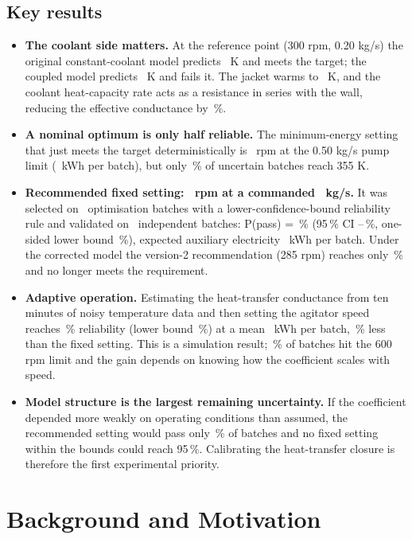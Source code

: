 \documentclass[11pt,letterpaper]{article}
\begin{document}
\subsection{Key results}
\begin{itemize}[leftmargin=*]
\item \textbf{The coolant side matters.} At the reference point (300 rpm, 0.20 kg/s) the original constant-coolant model predicts \vTOrig\ K and meets the target; the coupled model predicts \vTBase\ K and fails it. The jacket warms to \vPeakTJBase\ K, and the coolant heat-capacity rate acts as a resistance in series with the wall, reducing the effective conductance by \vUAEffDrop\,\%.
\item \textbf{A nominal optimum is only half reliable.} The minimum-energy setting that just meets the target deterministically is \vNomRpm\ rpm at the 0.50 kg/s pump limit (\vNomE\ kWh per batch), but only \vNomPass\,\% of uncertain batches reach 355 K.
\item \textbf{Recommended fixed setting: \vRecRpm\ rpm at a commanded \vRecM\ kg/s.} It was selected on \vNOpt\ optimisation batches with a lower-confidence-bound reliability rule and validated on \vNVal\ independent batches: P(pass) = \vRecPass\,\% (95\,\% CI \vRecLo--\vRecHi\,\%, one-sided lower bound \vRecLB\,\%), expected auxiliary electricity \vRecE\ kWh per batch. Under the corrected model the version-2 recommendation (285 rpm) reaches only \vVTwoRecPass\,\% and no longer meets the requirement.
\item \textbf{Adaptive operation.} Estimating the heat-transfer conductance from ten minutes of noisy temperature data and then setting the agitator speed reaches \vAdPass\,\% reliability (lower bound \vAdLB\,\%) at a mean \vAdMeanE\ kWh per batch, \vAdSave\,\% less than the fixed setting. This is a simulation result; \vAdCap\,\% of batches hit the 600 rpm limit and the gain depends on knowing how the coefficient scales with speed.
\item \textbf{Model structure is the largest remaining uncertainty.} If the coefficient depended more weakly on operating conditions than assumed, the recommended setting would pass only \vWeakFixed\,\% of batches and no fixed setting within the bounds could reach 95\,\%. Calibrating the heat-transfer closure is therefore the first experimental priority.
\end{itemize}

\section{Background and Motivation}
\end{document}
